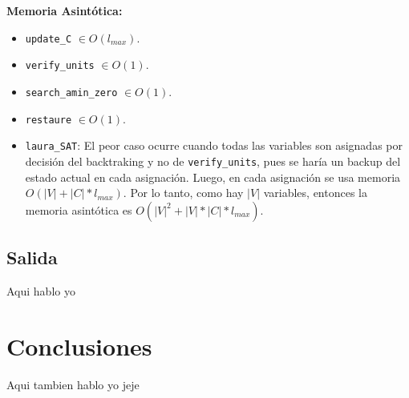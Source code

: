 \documentclass[letterpaper,12pt]{article}
\begin{document}
\textbf{Memoria Asintótica:} 
\begin{itemize}
	\item \texttt{update\_C} $\in O(l_{max})$.

	\item \texttt{verify\_units} $\in O(1)$.
	
	\item \texttt{search\_amin\_zero} $\in O(1)$.
	
	\item \texttt{restaure} $\in O(1)$.

	\item \texttt{laura\_SAT}: El peor caso ocurre cuando todas las variables son asignadas por decisi\'on del backtraking y no de \texttt{verify\_units}, pues se har\'ia un backup del estado actual en cada asignaci\'on. Luego, en cada asignaci\'on se usa memoria  $O(|V| + |C|*l_{max})$. Por lo tanto, como hay $|V|$ variables, entonces la memoria asint\'otica es $O(|V|^2 + |V|*|C|*l_{max})$.
\end{itemize}

\subsection{Salida}

Aqui hablo yo

\section{Conclusiones}

Aqui tambien hablo yo jeje
\end{document}
